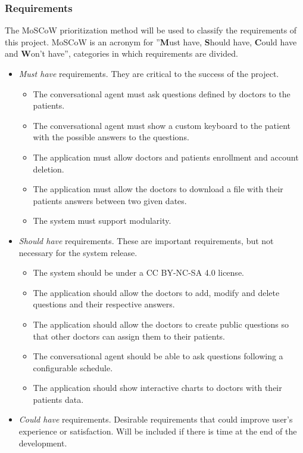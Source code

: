 \documentclass[12pt,english]{article}
\begin{document}
\subsubsection{Requirements}
The MoSCoW prioritization method \cite{moscow} will be used to classify the requirements of this project. MoSCoW is an acronym for ''\textbf{M}ust have, \textbf{S}hould have, \textbf{C}ould have and \textbf{W}on't have'', categories in which requirements are divided.
\begin{itemize}
  \item \emph{Must have} requirements. They are critical to the success of the project.
    \begin{itemize}
      \item The conversational agent must ask questions defined by doctors to the patients.
      \item The conversational agent must show a custom keyboard to the patient with the possible answers to the questions.
      \item The application must allow doctors and patients enrollment and account deletion.
      \item The application must allow the doctors to download a file with their patients answers between two given dates.
      \item The system must support modularity.
    \end{itemize}
  \item \emph{Should have} requirements. These are important requirements, but not necessary for  the system release.
    \begin{itemize}
      \item The system should be under a CC BY-NC-SA 4.0 \cite{CC} license.
      \item The application should allow the doctors to add, modify and delete questions and their respective answers.
      \item The application should allow the doctors to create public questions so that other doctors can assign them to their patients.
      \item The conversational agent should be able to ask questions following a configurable schedule.
      \item The application should show interactive charts to doctors with their patients data.
     \end{itemize}
  \item \emph{Could have} requirements. Desirable requirements that could improve user's experience or satisfaction. Will be included if there is time at the end of the development.

\end{itemize}
\end{document}
